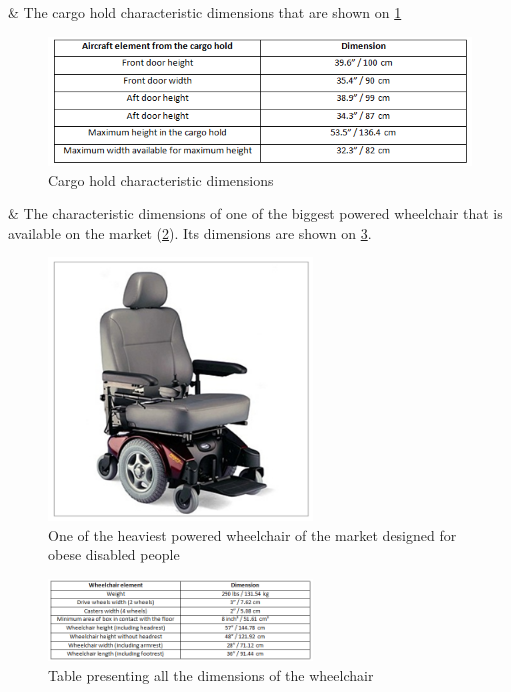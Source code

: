 \begin{easylist}[itemize]

& The cargo hold characteristic dimensions that are shown on \ref{fig:cargo_hold_geometry_table} 

\begin{figure}[h]
\centering
\includegraphics[width=12cm]{images/cargo_hold_geometry_table.png}
\caption{Cargo hold characteristic dimensions}
\label{fig:cargo_hold_geometry_table}
\end{figure}

& The characteristic dimensions of one of the biggest powered wheelchair that is available on the market (\ref{fig:heavy_wheelchair}). Its dimensions are shown on \ref{fig:wheelchair_geometry_table}.

\begin{figure}[h]
\centering
\includegraphics[width=7cm]{images/heavy_wheelchair.png}
\caption{One of the heaviest powered wheelchair of the market designed for obese disabled people \cite{powerwheelchair}}
\label{fig:heavy_wheelchair}
\end{figure}

\begin{figure}[h]
\centering
\includegraphics[width=7cm]{images/wheelchair_geometry_table.png}
\caption{Table presenting all the dimensions of the wheelchair}
\label{fig:wheelchair_geometry_table}
\end{figure}

\end{easylist}

